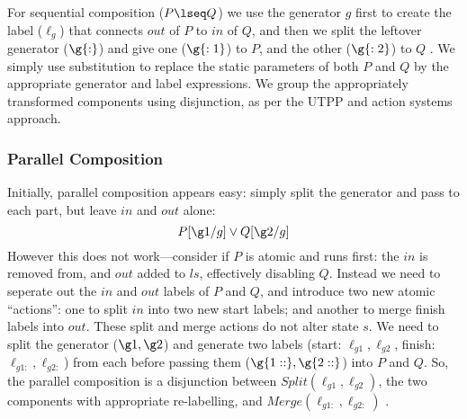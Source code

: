 For sequential composition ($P \lseq Q$) we use the generator $g$
first to create the label ($\ell_g$) that connects $out$ of $P$ to $in$ of $Q$,
and then we split the leftover generator ($\g{:}$)
and give one ($\g{:1}$) to $P$, and the other ($\g{:2}$) to $Q$%
.
We simply use substitution to replace the static parameters
of both $P$ and $Q$ by the appropriate generator and label expressions.
We group the appropriately transformed components
using disjunction, as per the UTPP and action systems approach.


\subsubsection{Parallel Composition}



Initially, parallel composition appears easy:
simply split the generator and pass to each part,
but leave $in$ and $out$ alone:
\[
  P[\g1/g] \lor Q[\g2/g]
\]
However this does not work---consider if $P$ is atomic and runs first:
the $in$ is removed from, and $out$ added to $ls$, effectively disabling $Q$.
Instead we need to seperate out the $in$ and $out$ labels of $P$ and $Q$,
and introduce two new atomic ``actions'': one to split $in$  into two new
start labels; and another to merge finish labels into $out$.
These split and merge actions do not alter state $s$.
We need to split the generator ($\g1,\g2$)
and generate two labels
(start: $\ell_{g1},\ell_{g2}$,
 finish: $\ell_{g1:},\ell_{g2:}$)
from each before passing them ($\g{1::},\g{2::}$) into $P$ and $Q$.
So, the parallel composition is a disjunction between
$Split(\ell_{g1},\ell_{g2})$,
the two components with appropriate re-labelling,
and $Merge(\ell_{g1:},\ell_{g2:})$%
.


